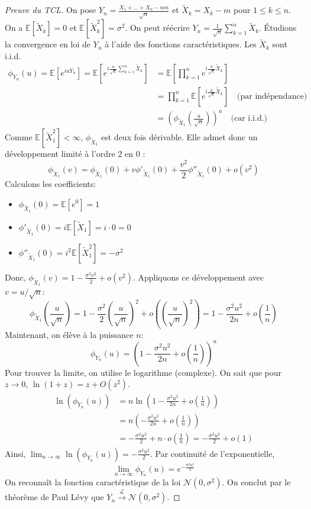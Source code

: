 \begin{proof}[Preuve du TCL]
On pose $Y_n = \frac{X_1 + \dots + X_n - nm}{\sqrt{n}}$ et $\tilde{X}_k = X_k - m$ pour $1 \leq k \leq n$.
On a $\mathbb{E}[\tilde{X}_k] = 0$ et $\mathbb{E}[\tilde{X}_k^2] = \sigma^2$.
On peut réécrire $Y_n = \frac{1}{\sqrt{n}} \sum_{k=1}^n \tilde{X}_k$.
Étudions la convergence en loi de $Y_n$ à l'aide des fonctions caractéristiques. Les $\tilde{X}_k$ sont i.i.d.
\begin{align*}
    \phi_{Y_n}(u) = \mathbb{E}\left[ e^{iu Y_n} \right] = \mathbb{E}\left[ e^{i \frac{u}{\sqrt{n}} \sum_{k=1}^n \tilde{X}_k} \right] &= \mathbb{E}\left[ \prod_{k=1}^n e^{i \frac{u}{\sqrt{n}} \tilde{X}_k} \right] \\
    &= \prod_{k=1}^n \mathbb{E}\left[ e^{i \frac{u}{\sqrt{n}} \tilde{X}_k} \right] \quad \text{(par indépendance)} \\
    &= \left( \phi_{\tilde{X}_1}\left(\frac{u}{\sqrt{n}}\right) \right)^n \quad \text{(car i.i.d.)}
\end{align*}
Comme $\mathbb{E}[\tilde{X}_1^2] < \infty$, $\phi_{\tilde{X}_1}$ est deux fois dérivable. Elle admet donc un développement limité à l'ordre 2 en 0 :
\[ \phi_{\tilde{X}_1}(v) = \phi_{\tilde{X}_1}(0) + v \phi'_{\tilde{X}_1}(0) + \frac{v^2}{2} \phi''_{\tilde{X}_1}(0) + o(v^2) \]
Calculons les coefficients:
\begin{itemize}
    \item $\phi_{\tilde{X}_1}(0) = \mathbb{E}[e^0] = 1$
    \item $\phi'_{\tilde{X}_1}(0) = i \mathbb{E}[\tilde{X}_1] = i \cdot 0 = 0$
    \item $\phi''_{\tilde{X}_1}(0) = i^2 \mathbb{E}[\tilde{X}_1^2] = - \sigma^2$
\end{itemize}
Donc, $\phi_{\tilde{X}_1}(v) = 1 - \frac{\sigma^2 v^2}{2} + o(v^2)$.
Appliquons ce développement avec $v = u/\sqrt{n}$:
\[ \phi_{\tilde{X}_1}\left(\frac{u}{\sqrt{n}}\right) = 1 - \frac{\sigma^2}{2} \left(\frac{u}{\sqrt{n}}\right)^2 + o\left(\left(\frac{u}{\sqrt{n}}\right)^2\right) = 1 - \frac{\sigma^2 u^2}{2n} + o\left(\frac{1}{n}\right) \]
Maintenant, on élève à la puissance $n$:
\[ \phi_{Y_n}(u) = \left( 1 - \frac{\sigma^2 u^2}{2n} + o\left(\frac{1}{n}\right) \right)^n \]
Pour trouver la limite, on utilise le logarithme (complexe). On sait que pour $z \to 0$, $\ln(1+z) = z + O(z^2)$.
\begin{align*}
    \ln(\phi_{Y_n}(u)) &= n \ln\left( 1 - \frac{\sigma^2 u^2}{2n} + o\left(\frac{1}{n}\right) \right) \\
    &= n \left( -\frac{\sigma^2 u^2}{2n} + o\left(\frac{1}{n}\right) \right) \\
    &= -\frac{\sigma^2 u^2}{2} + n \cdot o\left(\frac{1}{n}\right) = -\frac{\sigma^2 u^2}{2} + o(1)
\end{align*}
Ainsi, $\lim_{n \to \infty} \ln(\phi_{Y_n}(u)) = -\frac{\sigma^2 u^2}{2}$.
Par continuité de l'exponentielle,
\[ \lim_{n \to \infty} \phi_{Y_n}(u) = e^{-\frac{\sigma^2 u^2}{2}} \]
On reconnaît la fonction caractéristique de la loi $\mathcal{N}(0, \sigma^2)$.
On conclut par le théorème de Paul Lévy que $Y_n \xrightarrow{\mathcal{L}} \mathcal{N}(0, \sigma^2)$.
\end{proof}
